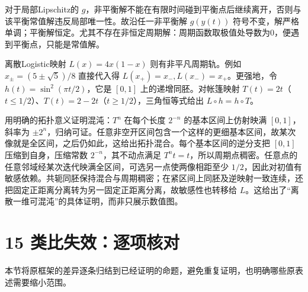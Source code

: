 \documentclass[11pt,a4paper]{article}
\begin{document}
对于局部Lipschitz的
\(g\)，非平衡解不能在有限时间碰到平衡点后继续离开，否则与该平衡常值解违反局部唯一性。故沿任一非平衡解
\(g(y(t))\)
符号不变，解严格单调；平衡解恒定。尤其不存在非恒定周期解：周期函数取极值处导数为0，便遇到平衡点，只能是常值解。

离散Logistic映射 \(L(x)=4x(1-x)\) 则有非平凡周期轨。例如
\(x_\pm=(5\pm\sqrt5)/8\) 直接代入得
\(L(x_+)=x_-,L(x_-)=x_+\)。更强地，令 \(h(t)=\sin^2(\pi t/2)\)，它是
\([0,1]\) 上的递增同胚。对帐篷映射
\(T(t)=2t\)（\(t\le1/2\)）、\(T(t)=2-2t\)（\(t\ge1/2\)），三角恒等式给出
\(L\circ h=h\circ T\)。

用明确的拓扑意义证明混沌：\(T^n\) 在每个长度 \(2^{-n}\)
的基本区间上仿射映满 \([0,1]\)，斜率为
\(\pm2^n\)，归纳可证。任意非空开区间包含一个这样的更细基本区间，故某次像就是全区间，之后仍如此，这给出拓扑混合。每个基本区间的逆分支把
\([0,1]\) 压缩到自身，压缩常数 \(2^{-n}\)，其不动点满足
\(T^nt=t\)，所以周期点稠密。任意点的任意邻域经某次迭代映满全区间，可选另一点使两像相距至少
\(1/2\)，因此对初值有敏感依赖。共轭同胚保持混合与周期稠密；在紧区间上同胚及逆映射一致连续，还把固定正距离分离转为另一固定正距离分离，故敏感性也转移给
\(L\)。这给出了``离散一维可混沌''的具体证明，而非只展示数值图。

\clearpage

\section{15
类比失效：逐项核对}\label{ux7c7bux6bd4ux5931ux6548ux9010ux9879ux6838ux5bf9}

本节将原框架的差异逐条归结到已经证明的命题，避免重复证明，也明确哪些原表述需要缩小范围。
\end{document}
